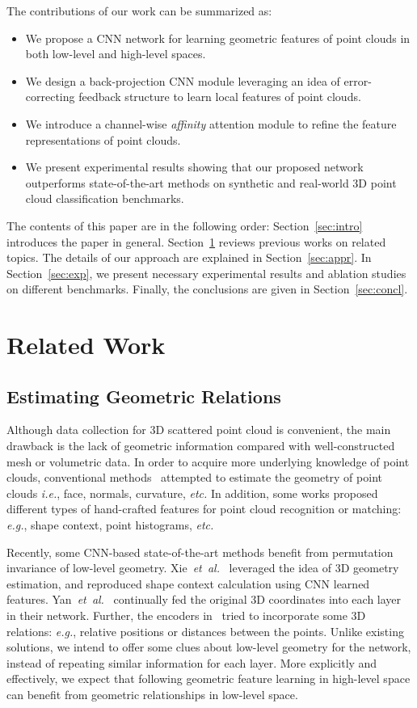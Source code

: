 \documentclass[journal,twoside]{IEEEtran}
\newcommand{\latinphrase}[1]{\textit{#1}}
\newcommand{\etal}{\latinphrase{et~al.}\xspace}
\newcommand{\ie}{\latinphrase{i.e.}\xspace}
\newcommand{\eg}{\latinphrase{e.g.}\xspace}
\newcommand{\etc}{\latinphrase{etc.}\xspace}
\begin{document}
The contributions of our work can be summarized as:
\begin{itemize}
\item We propose a CNN network for learning geometric features of point clouds in both low-level and high-level spaces.
\item We design a back-projection CNN module leveraging an idea of error-correcting feedback structure to learn local features of point clouds. 
\item We introduce a channel-wise \emph{affinity} attention module to refine the feature representations of point clouds.
\item We present experimental results showing that our proposed network outperforms state-of-the-art methods on synthetic and real-world 3D point cloud classification benchmarks.
\end{itemize}

The contents of this paper are in the following order: Section~\ref{sec:intro} introduces the paper in general. Section~\ref{sec:rel} reviews previous works on related topics. The details of our approach are explained in Section~\ref{sec:appr}. In Section~\ref{sec:exp}, we present necessary experimental results and ablation studies on different benchmarks. Finally, the conclusions are given in Section~\ref{sec:concl}.

\section{Related Work}
\label{sec:rel}
\subsection{Estimating Geometric Relations}
Although data collection for 3D scattered point cloud is convenient, the main drawback is the lack of geometric information compared with well-constructed mesh or volumetric data. In order to acquire more underlying knowledge of point clouds, conventional methods~\cite{mitra2003estimating, merigot2010voronoi, vosselman20013d} attempted to estimate the geometry of point clouds \ie, face, normals, curvature, \etc In addition, some works proposed different types of hand-crafted features for point cloud recognition or matching: \eg, shape context\cite{kortgen20033d}, point histograms\cite{rusu2009fast}, \etc 

Recently, some CNN-based state-of-the-art methods benefit from permutation invariance of low-level geometry. Xie~\etal~\cite{xie2018attentional} leveraged the idea of 3D geometry estimation, and reproduced shape context calculation using CNN learned features. Yan~\etal~\cite{Yan_2020_CVPR} continually fed the original 3D coordinates into each layer in their network. Further, the encoders in~\cite{liu2019relation, Hu_2020_CVPR} tried to incorporate some 3D relations: \eg, relative positions or distances between the points. Unlike existing solutions, we intend to offer some clues about low-level geometry for the network, instead of repeating similar information for each layer. More explicitly and effectively, we expect that following geometric feature learning in high-level space can benefit from geometric relationships in low-level space.   
\end{document}
